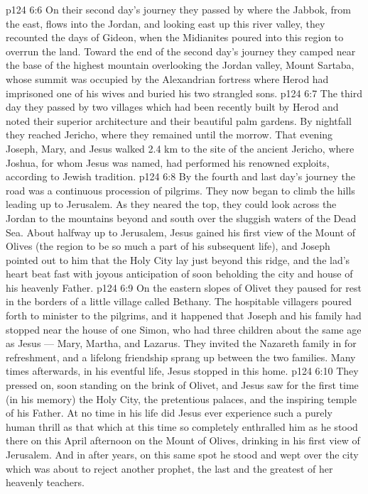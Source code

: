 \vs p124 6:6 \pc On their second day’s journey they passed by where the Jabbok, from the east, flows into the Jordan, and looking east up this river valley, they recounted the days of Gideon, when the Midianites poured into this region to overrun the land. Toward the end of the second day’s journey they camped near the base of the highest mountain overlooking the Jordan valley, Mount Sartaba, whose summit was occupied by the Alexandrian fortress where Herod had imprisoned one of his wives and buried his two strangled sons.
\vs p124 6:7 The third day they passed by two villages which had been recently built by Herod and noted their superior architecture and their beautiful palm gardens. By nightfall they reached Jericho, where they remained until the morrow. That evening Joseph, Mary, and Jesus walked 2.4 km to the site of the ancient Jericho, where Joshua, for whom Jesus was named, had performed his renowned exploits, according to Jewish tradition.
\vs p124 6:8 By the fourth and last day’s journey the road was a continuous procession of pilgrims. They now began to climb the hills leading up to Jerusalem. As they neared the top, they could look across the Jordan to the mountains beyond and south over the sluggish waters of the Dead Sea. About halfway up to Jerusalem, Jesus gained his first view of the Mount of Olives (the region to be so much a part of his subsequent life), and Joseph pointed out to him that the Holy City lay just beyond this ridge, and the lad’s heart beat fast with joyous anticipation of soon beholding the city and house of his heavenly Father.
\vs p124 6:9 On the eastern slopes of Olivet they paused for rest in the borders of a little village called Bethany. The hospitable villagers poured forth to minister to the pilgrims, and it happened that Joseph and his family had stopped near the house of one Simon, who had three children about the same age as Jesus --- Mary, Martha, and Lazarus. They invited the Nazareth family in for refreshment, and a lifelong friendship sprang up between the two families. Many times afterwards, in his eventful life, Jesus stopped in this home.
\vs p124 6:10 They pressed on, soon standing on the brink of Olivet, and Jesus saw for the first time (in his memory) the Holy City, the pretentious palaces, and the inspiring temple of his Father. At no time in his life did Jesus ever experience such a purely human thrill as that which at this time so completely enthralled him as he stood there on this April afternoon on the Mount of Olives, drinking in his first view of Jerusalem. And in after years, on this same spot he stood and wept over the city which was about to reject another prophet, the last and the greatest of her heavenly teachers.
